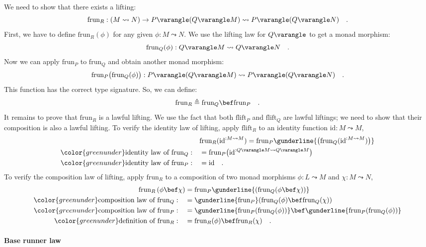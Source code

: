 We need to show that there exists a lifting:
\[
\text{frun}_{R}:\left(M\leadsto N\right)\rightarrow P\varangle(Q\varangle M)\leadsto P\varangle(Q\varangle N)\quad.
\]
First, we have to define $\text{frun}_{R}(\phi)$ for any given $\phi:M\leadsto N$.
We use the lifting law for $Q\varangle$ to get a monad morphism:
\[
\text{frun}_{Q}(\phi):Q\varangle M\leadsto Q\varangle N\quad.
\]
Now we can apply $\text{frun}_{P}$ to $\text{frun}_{Q}$ and obtain
another monad morphism:
\[
\text{frun}_{P}\big(\text{frun}_{Q}(\phi)\big):P\varangle(Q\varangle M)\leadsto P\varangle(Q\varangle N)\quad.
\]
This function has the correct type signature. So, we can define:
\[
\text{frun}_{R}\triangleq\text{frun}_{Q}\bef\text{frun}_{P}\quad.
\]
It remains to prove that $\text{frun}_{R}$ is a lawful lifting. We
use the fact that both $\text{flift}_{P}$ and $\text{flift}_{Q}$
are lawful liftings; we need to show that their composition is also
a lawful lifting. To verify the identity law of lifting, apply $\text{flift}_{R}$
to an identity function $\text{id}:M\leadsto M$,
\begin{align*}
 & \text{frun}_{R}(\text{id}^{:M\leadsto M})=\text{frun}_{P}\gunderline{\big(\text{frun}_{Q}(\text{id}^{:M\leadsto M})\big)}\\
{\color{greenunder}\text{identity law of }\text{frun}_{Q}:}\quad & =\text{frun}_{P}\big(\text{id}^{:Q\varangle M\leadsto Q\varangle M}\big)\\
{\color{greenunder}\text{identity law of }\text{frun}_{P}:}\quad & =\text{id}\quad.
\end{align*}
To verify the composition law of lifting, apply $\text{frun}_{R}$
to a composition of two monad morphisms $\phi:L\leadsto M$ and $\chi:M\leadsto N$,
\begin{align*}
\text{frun}_{R}\left(\phi\bef\chi\right) & =\text{frun}_{P}\gunderline{(\text{frun}_{Q}(\phi\bef\chi))}\\
{\color{greenunder}\text{composition law of }\text{frun}_{Q}:}\quad & =\gunderline{\text{frun}_{P}}(\text{frun}_{Q}(\phi)\bef\text{frun}_{Q}(\chi))\\
{\color{greenunder}\text{composition law of }\text{frun}_{P}:}\quad & =\gunderline{\text{frun}_{P}(\text{frun}_{Q}(\phi))}\bef\gunderline{\text{frun}_{P}(\text{frun}_{Q}(\phi))}\\
{\color{greenunder}\text{definition of }\text{frun}_{R}:}\quad & =\text{frun}_{R}(\phi)\bef\text{frun}_{R}(\chi)\quad.
\end{align*}


\paragraph{Base runner law}

